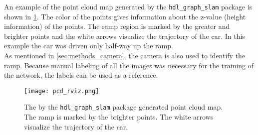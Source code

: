 An example of the point cloud map generated by the \texttt{hdl\_graph\_slam} package is shown in \cref{fig:pcd_rviz}.
The color of the points gives information about the z-value (height information) of the points.
The ramp region is marked by the greater and brighter points and the white arrows visualize the trajectory of the car.
In this example the car was driven only half-way up the ramp.\\
As mentioned in \cref{sec:methods_camera}, the camera is also used to identify the ramp.
Because manual labeling of all the images was necessary for the training of the network, the labels can be used as a reference.
\begin{figure}[htbp]
	\centering
	\texttt{[image: pcd\_rviz.png]}
	\caption[Generated point cloud map]{The by the \texttt{hdl\_graph\_slam} package generated point cloud map. The ramp is marked by the brighter points. The white arrows visualize the trajectory of the car.}
	\label{fig:pcd_rviz}
\end{figure}



